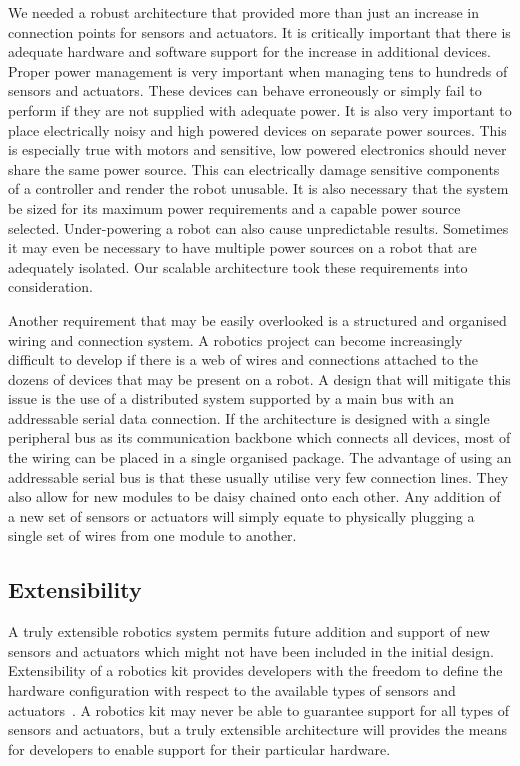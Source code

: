  We needed a robust architecture that provided more than just an increase in connection points for sensors and actuators. It is critically important that there is adequate hardware and software support for the increase in additional devices. Proper power management is very important when managing tens to hundreds of sensors and actuators. These devices can behave erroneously or simply fail to perform if they are not supplied with adequate power. It is also very important to place electrically noisy and high powered devices on separate power sources. This is especially true with motors and sensitive, low powered electronics should never share the same power source. This can electrically damage sensitive components of a controller and render the robot unusable. It is also necessary that the system be sized for its maximum power requirements and a capable power source selected. Under-powering a robot can also cause unpredictable results. Sometimes it may even be necessary to have multiple power sources on a robot that are adequately isolated. Our scalable architecture took these requirements into consideration.

Another requirement that may be easily overlooked is a structured and organised wiring and connection system. A robotics project can become increasingly difficult to develop if there is a web of wires and connections attached to the dozens of devices that may be present on a robot. A design that will mitigate this issue is the use of a distributed system supported by a main bus with an addressable serial data connection. If the architecture is designed with a single peripheral bus as its communication backbone which connects all devices, most of the wiring can be placed in a single organised package. The advantage of using an addressable serial bus is that these usually utilise very few connection lines. They also allow for new modules to be daisy chained onto each other. Any addition of a new set of sensors or actuators will simply equate to physically plugging a single set of wires from one module to another.




\subsection{Extensibility} %
\label{sub:extensibility}
A truly extensible robotics system permits future addition and support of new sensors and actuators which might not have been included in the initial design. Extensibility of a robotics kit provides developers with the freedom to define the hardware configuration with respect to the available types of sensors and actuators~\parencite{rdk}. A robotics kit may never be able to guarantee support for all types of sensors and actuators, but a truly extensible architecture will provides the means for developers to enable support for their particular hardware. 

